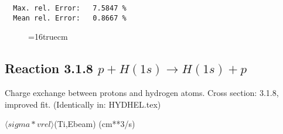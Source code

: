 \documentclass[12pt,dvipdfmx]{article}
\begin{document}
\begin{small}
\begin{verbatim}
  Max. rel. Error:   7.5847 %
  Mean rel. Error:   0.8667 %

\end{verbatim}\end{small}


\begin{figure} \label{2.3.9H3}
\epsfxsize=16truecm
\end{figure}
\newpage
\subsection{
Reaction 3.1.8  $ p + H(1s) \rightarrow H(1s) + p   $
}

 Charge exchange between protons and hydrogen
 atoms. Cross section:  3.1.8, improved fit. (Identically in: HYDHEL.tex)

$  \langle sigma*vrel \rangle$(Ti,Ebeam)  (cm**3/s)
\end{document}
